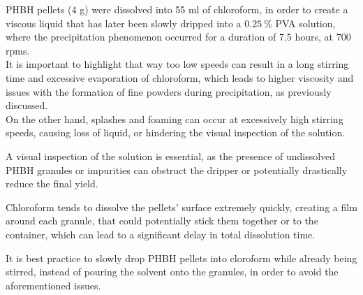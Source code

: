 \documentclass{article}
\begin{document}
        \clearpage

        PHBH pellets (4 g) were dissolved into 55 ml of chloroform, in order to create a viscous liquid that has later been slowly dripped into a 
        $0.25 \ \%$ PVA solution, where the precipitation phenomenon occurred for a duration of 7.5 hours, at 700 rpms. \\ 

        
        It is important to highlight that way too low speeds can result in a long stirring time and excessive evaporation of chloroform, which leads to 
        higher viscosity and issues with the formation of fine powders during precipitation, as previously discussed. \\ 

        On the other hand, splashes and foaming can occur at excessively high stirring speeds, causing loss of liquid, or
        hindering the visual inspection of the solution. 

        A visual inspection of the solution is essential, as the presence of undissolved PHBH granules or impurities can 
        obstruct the dripper or potentially drastically reduce the final yield. 

        Chloroform tends to dissolve the pellets' surface extremely quickly, creating a film around each granule, that could potentially stick 
        them together or to the container, which can lead to a significant delay in total dissolution time. 

        It is best practice to slowly drop PHBH pellets into cloroform while already being stirred, instead of pouring 
        the solvent onto the granules, in order to avoid the aforementioned issues. \\ 
\end{document}
